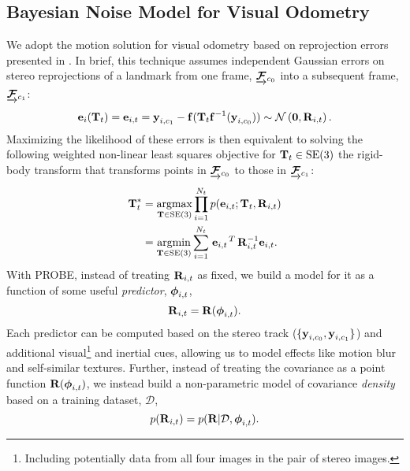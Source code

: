 \subsection{Bayesian Noise Model for Visual Odometry}
We adopt the motion solution for visual odometry based on reprojection errors presented in . In brief, this technique assumes independent Gaussian errors on stereo reprojections of a landmark from one frame, $\underrightarrow{ \boldsymbol{\mathbf{\mathcal{F}}} }_{c_0}$ into a subsequent frame, $\underrightarrow{ \boldsymbol{\mathbf{\mathcal{F}}} }_{c_1}$: 
 \begin{equation}
  \boldsymbol{\mathbf{e}}_{i}(\boldsymbol{\mathbf{T}}_t) = \boldsymbol{\mathbf{e}}_{i,t} = \boldsymbol{\mathbf{y}}_{i, c_1} - \boldsymbol{\mathbf{f}}( \boldsymbol{\mathbf{T}}_t 
    \boldsymbol{\mathbf{f}}^{-1}( \boldsymbol{\mathbf{y}}_{i, c_0} ) ) \sim 
 \mathcal{N}\left(\boldsymbol{\mathbf{0}},  \boldsymbol{\mathbf{R}}_{i,t}\right). 
\end{equation}
Maximizing the likelihood of these errors is then equivalent to solving the following weighted non-linear least squares objective for $\boldsymbol{\mathbf{T}}_t \in \mathrm{SE}(3)$ the rigid-body transform that transforms points in  $\underrightarrow{ \boldsymbol{\mathbf{\mathcal{F}}} }_{c_0}$ to those in $\underrightarrow{ \boldsymbol{\mathbf{\mathcal{F}}} }_{c_1}$:
\begin{align}
\label{eq:probe_vo_objective}
  \boldsymbol{\mathbf{T}}_t^* &=  \operatorname*{argmax}_{\boldsymbol{\mathbf{T}}\in\text{SE}(3)} \prod_{i=1}^{N_t} p(\boldsymbol{\mathbf{e}}_{i,t}; \boldsymbol{\mathbf{T}}_t,  \boldsymbol{\mathbf{R}}_{i,t}) \\
  &= \operatorname*{argmin}_{\boldsymbol{\mathbf{T}}\in\text{SE}(3)}\sum_{i=1}^{N_t} 
  \left.{\boldsymbol{\mathbf{e}}_{i,t}}\right.^T \boldsymbol{\mathbf{R}}_{i,t}^{-1} \boldsymbol{\mathbf{e}}_{i,t}.
\end{align}
With PROBE, instead of treating $\boldsymbol{\mathbf{R}}_{i,t}$ as fixed, we build a model for it as a function of some useful \textit{predictor}, $\boldsymbol{\mathbf{\phi}}_{i,t}$, 
\begin{equation}
\boldsymbol{\mathbf{R}}_{i,t} = \boldsymbol{\mathbf{R}}(\boldsymbol{\mathbf{\phi}}_{i,t}).	
\end{equation}
Each predictor can be computed based on the stereo track ($\{\boldsymbol{\mathbf{y}}_{i, c_0}, \boldsymbol{\mathbf{y}}_{i, c_1}\}$) and additional visual\footnote{Including potentially data from all four images in the pair of stereo images.} and inertial cues, allowing us to model effects like motion blur and self-similar textures. Further, instead of treating the covariance as a point function $\boldsymbol{\mathbf{R}}(\boldsymbol{\mathbf{\phi}}_{i,t})	
$, we instead build a non-parametric model of covariance \textit{density} based on a training dataset, $\mathcal{D}$,
\begin{equation}
	p(\boldsymbol{\mathbf{R}}_{i,t}) = p(\boldsymbol{\mathbf{R}}|\mathcal{D}, \boldsymbol{\mathbf{\phi}}_{i,t}).
\end{equation}
